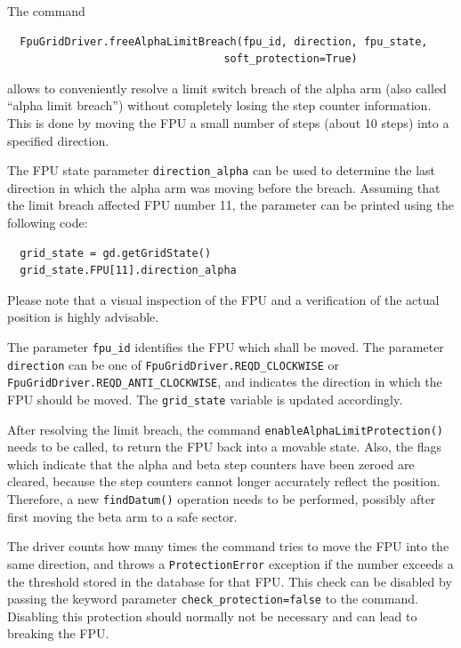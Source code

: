 \documentclass[fontsize=12,a4paper]{scrreprt}
\begin{document}
The command
\begin{verbatim}
  FpuGridDriver.freeAlphaLimitBreach(fpu_id, direction, fpu_state,
                                  soft_protection=True)
\end{verbatim}
allows to conveniently resolve a limit switch breach of the alpha arm
(also called ``alpha limit breach'') without completely losing the
step counter information. This is done by moving the FPU a small
number of steps (about 10 steps) into a specified direction.

%
The FPU state parameter \texttt{direction\_alpha} can be used to
determine the last direction in which the alpha arm was moving before
the breach. Assuming that the limit breach affected FPU number 11,
the parameter can be printed using the following code:

\begin{verbatim}
  grid_state = gd.getGridState()
  grid_state.FPU[11].direction_alpha
\end{verbatim}


Please note that a visual inspection of the FPU and a
verification of the actual position is highly advisable.

\begin{sloppypar}
The parameter \texttt{fpu\_id} identifies the FPU which shall be
moved. The parameter \texttt{direction} can be one of
\texttt{FpuGridDriver.REQD\_CLOCKWISE} or
\texttt{FpuGridDriver.REQD\_ANTI\_CLOCKWISE}, and indicates the
direction in which the FPU should be moved. The \texttt{grid\_state}
variable is updated accordingly.
\end{sloppypar}

After resolving the limit breach, the command
\texttt{enableAlphaLimitProtection()} needs to be called, to return
the FPU back into a movable state.  Also, the flags which indicate
that the alpha and beta step counters have been zeroed are cleared,
because the step counters cannot longer accurately reflect the
position. Therefore, a new \texttt{findDatum()} operation needs to be
performed, possibly after first moving the beta arm to a safe sector.

The driver counts how many times the command tries to move the FPU
into the same direction, and throws a \texttt{ProtectionError}
exception if the number exceeds a the threshold stored in the database
for that FPU. This check can be disabled by passing the keyword
parameter \texttt{check\_protection=false} to the command. Disabling
this protection should normally not be necessary and can lead to
breaking the FPU.
\end{document}
